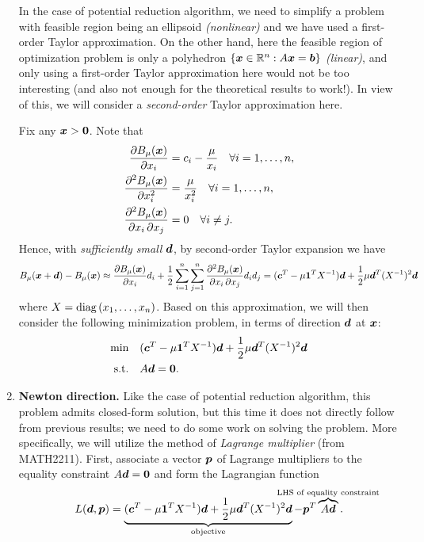 \begin{enumerate}
In the case of potential reduction algorithm, we need to simplify a problem
with feasible region being an ellipsoid \emph{(nonlinear)} and we have used a
first-order Taylor approximation. On the other hand, here the feasible region
of optimization problem is only a polyhedron
\(\{\bm{x}\in\mathbb{R}^{n}:A\bm{x}=\bm{b}\}\) \emph{(linear)}, and only using a
first-order Taylor approximation here would not be too interesting (and also
not enough for the theoretical results to work!). In view of this, we will
consider a \emph{second-order} Taylor approximation here.

Fix any \(\bm{x}>\bm{0}\). Note that
\begin{align*}
\pdv{B_{\mu}(\bm{x})}{x_i}&=c_i-\frac{\mu}{x_i}\quad\forall i=1,\dotsc,n, \\
\pdv[order=2]{B_{\mu}(\bm{x})}{x_i}&=\frac{\mu}{x_i^{2}}
\quad\forall i=1,\dotsc,n, \\
\pdv{B_{\mu}(\bm{x})}{x_i,x_j}&=0\quad\forall i\ne j.
\end{align*}
Hence, with \emph{sufficiently small} \(\bm{d}\), by second-order
Taylor expansion we have
\[
B_{\mu}(\bm{x}+\bm{d})-B_{\mu}(\bm{x})\approx
\pdv{B_{\mu}(\bm{x})}{x_i}d_i
+\frac{1}{2}\sum_{i=1}^{n}\sum_{j=1}^{n}
\pdv{B_{\mu}(\bm{x})}{x_i,x_j}d_{i}d_{j}
=(\bm{c}^{T}-\mu\bm{1}^{T}X^{-1})\bm{d}
+\frac{1}{2}\mu\bm{d}^{T}(X^{-1})^{2}\bm{d}
\]
where \(X=\operatorname{diag}\left(x_1,\dotsc,x_n\right)\). Based on this approximation, we will then
consider the following minimization problem, in terms of direction \(\bm{d}\)
at \(\bm{x}\):
\begin{align*}
\text{min}\quad&(\bm{c}^{T}-\mu\bm{1}^{T}X^{-1})\bm{d}
+\frac{1}{2}\mu\bm{d}^{T}(X^{-1})^{2}\bm{d}\\
\text{s.t.}\quad&A\bm{d}=\bm{0}.
\end{align*}
\item\label{it:newton-dir-fmla} \textbf{Newton direction.} Like the case of
potential reduction algorithm, this problem admits closed-form solution, but
this time it does not directly follow from previous results; we need to do some
work on solving the problem.  More specifically, we will utilize the method of
\emph{Lagrange multiplier} (from MATH2211). First, associate a vector
\(\bm{p}\) of Lagrange multipliers to the equality constraint
\(A\bm{d}=\bm{0}\) and form the Lagrangian function
\[
L(\vect{d},\vect{p})=
\underbrace{(\vect{c}^{T}-\mu\vect{1}^{T}X^{-1})\vect{d}
+\frac{1}{2}\mu\vect{d}^{T}(X^{-1})^{2}\vect{d}}_{\text{objective}}
-\vect{p}^{T}\overbrace{A\vect{d}}^{\mathclap{\text{LHS of equality constraint}}}.
\]
\end{enumerate}
